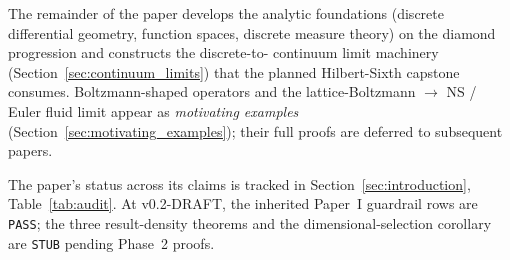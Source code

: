 \medskip

\noindent
The remainder of the paper develops the analytic foundations
(discrete differential geometry, function spaces, discrete measure
theory) on the diamond progression and constructs the discrete-to-
continuum limit machinery (Section~\ref{sec:continuum_limits})
that the planned Hilbert-Sixth capstone consumes.  Boltzmann-shaped
operators and the lattice-Boltzmann $\to$ NS / Euler fluid limit
appear as \emph{motivating examples}
(Section~\ref{sec:motivating_examples}); their full proofs are
deferred to subsequent papers.

\medskip

\noindent
The paper's status across its claims is tracked in
Section~\ref{sec:introduction}, Table~\ref{tab:audit}.  At
v0.2-DRAFT, the inherited Paper~I guardrail rows are \texttt{PASS};
the three result-density theorems and the dimensional-selection
corollary are \texttt{STUB} pending Phase~2 proofs.
